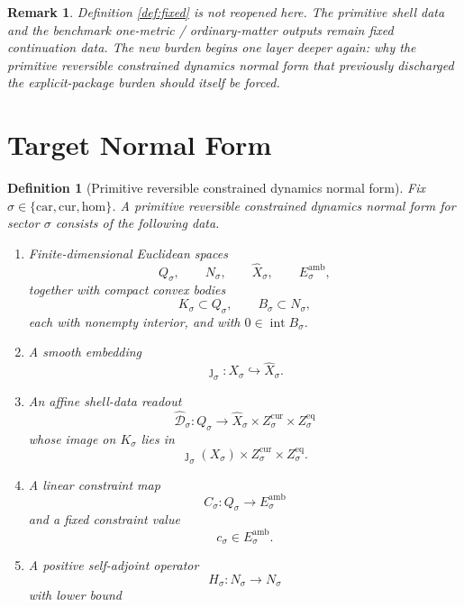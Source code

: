\documentclass[11pt]{article}
\newcommand{\Car}{\mathrm{car}}
\newcommand{\Cur}{\mathrm{cur}}
\newcommand{\Hom}{\mathrm{hom}}
\newcommand{\CoordSpace}[1]{Q_{#1}}
\newcommand{\CoordBody}[1]{K_{#1}}
\newcommand{\NormalSpace}[1]{N_{#1}}
\newcommand{\NormalBody}[1]{B_{#1}}
\newcommand{\VisibleAffine}[1]{\widehat X_{#1}}
\newcommand{\AffineData}[1]{\widehat{\mathcal D}_{#1}}
\newcommand{\ConstraintMap}[1]{C_{#1}}
\newcommand{\ConstraintValue}[1]{c_{#1}}
\newcommand{\NormalOperator}[1]{H_{#1}}
\newcommand{\AmbientTarget}[1]{E_{#1}^{\mathrm{amb}}}
\newtheorem{definition}{Definition}
\newtheorem{remark}{Remark}
\begin{document}
\begin{remark}
Definition \ref{def:fixed} is not reopened here. The primitive shell data and the benchmark one-metric / ordinary-matter outputs remain fixed continuation data. The new burden begins one layer deeper again: why the primitive reversible constrained dynamics normal form that previously discharged the explicit-package burden should itself be forced.
\end{remark}

\section{Target Normal Form}

\begin{definition}[Primitive reversible constrained dynamics normal form]
\label{def:normalform}
Fix \(\sigma\in\{\Car,\Cur,\Hom\}\). A \emph{primitive reversible constrained dynamics normal form} for sector \(\sigma\) consists of the following data.
\begin{enumerate}
    \item Finite-dimensional Euclidean spaces
    \[
    \CoordSpace{\sigma},
    \qquad
    \NormalSpace{\sigma},
    \qquad
    \VisibleAffine{\sigma},
    \qquad
    \AmbientTarget{\sigma},
    \]
    together with compact convex bodies
    \[
    \CoordBody{\sigma}\subset\CoordSpace{\sigma},
    \qquad
    \NormalBody{\sigma}\subset\NormalSpace{\sigma},
    \]
    each with nonempty interior, and with \(0\in\operatorname{int}\NormalBody{\sigma}\).
    \item A smooth embedding
    \[
    \jmath_{\sigma}:X_{\sigma}\hookrightarrow \VisibleAffine{\sigma}.
    \]
    \item An affine shell-data readout
    \[
    \AffineData{\sigma}:\CoordSpace{\sigma}\to
    \VisibleAffine{\sigma}\times Z_{\sigma}^{\mathrm{cur}}\times Z_{\sigma}^{\mathrm{eq}}
    \]
    whose image on \(\CoordBody{\sigma}\) lies in
    \[
    \jmath_{\sigma}(X_{\sigma})\times Z_{\sigma}^{\mathrm{cur}}\times Z_{\sigma}^{\mathrm{eq}}.
    \]
    \item A linear constraint map
    \[
    \ConstraintMap{\sigma}:\CoordSpace{\sigma}\to \AmbientTarget{\sigma}
    \]
    and a fixed constraint value
    \[
    \ConstraintValue{\sigma}\in\AmbientTarget{\sigma}.
    \]
    \item A positive self-adjoint operator
    \[
    \NormalOperator{\sigma}:\NormalSpace{\sigma}\to\NormalSpace{\sigma}
    \]
    with lower bound
    \begin{equation}

\end{equation}
\end{enumerate}
\end{definition}
\end{document}
